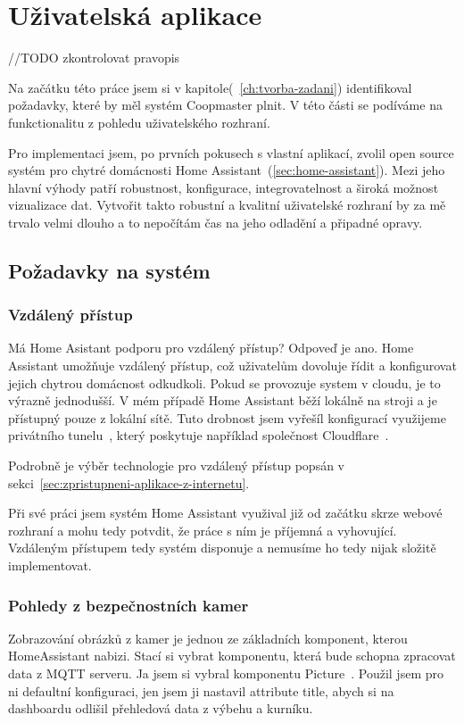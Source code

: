 \section{Uživatelská aplikace}\label{sec:tvorba-gui-rozhrani}
//TODO zkontrolovat pravopis\newline

Na začátku této práce jsem si v kapitole(~\ref{ch:tvorba-zadani}) identifikoval požadavky, které by měl systém Coopmaster plnit.
V této části se podíváme na funkctionalitu z pohledu uživatelského rozhraní.

Pro implementaci jsem, po prvních pokusech s vlastní aplikací, zvolil open source systém pro chytré domácnosti Home Assistant~(\ref{sec:home-assistant}).
Mezi jeho hlavní výhody patří robustnost, konfigurace, integrovatelnost a široká možnost vizualizace dat.
Vytvořit takto robustní a kvalitní uživatelské rozhraní by za mě trvalo velmi dlouho a to nepočítám čas na jeho odladění a připadné opravy.

\subsection{Požadavky na systém}

\subsubsection*{Vzdálený přístup}
Má Home Asistant podporu pro vzdálený přístup? Odpoveď je ano.
Home Assistant umožňuje vzdálený přístup, což uživatelům dovoluje řídit a konfigurovat jejich chytrou domácnost odkudkoli.
Pokud se provozuje system v cloudu, je to výrazně jednodušší.
V mém případě Home Assistant běží lokálně na stroji a je přístupný pouze z lokální sítě.
Tuto drobnost jsem vyřešíl konfigurací využijeme privátního tunelu~\cite{CloudflareTunnel}, který poskytuje například společnost Cloudflare~\cite{cloudflare}.

Podrobně je výběr technologie pro vzdálený přístup popsán v sekci~\ref{sec:zpristupneni-aplikace-z-internetu}.

Při své práci jsem systém Home Assistant využival již od začátku skrze webové rozhraní a mohu tedy potvdit, že práce s ním je příjemná a vyhovující.
Vzdáleným přístupem tedy systém disponuje a nemusíme ho tedy nijak složitě implementovat.

\subsubsection*{Pohledy z bezpečnostních kamer}
Zobrazování obrázků z kamer je jednou ze základních komponent, kterou HomeAssistant nabizi.
Stací si vybrat komponentu, která bude schopna zpracovat data z MQTT serveru.
Ja jsem si vybral komponentu Picture~\cite{HomeAssistantPictureCard}.
Použil jsem pro ni defaultní konfiguraci, jen jsem ji nastavil attribute title, abych si na dashboardu odlišil přehledová data z výbehu a kurníku.

